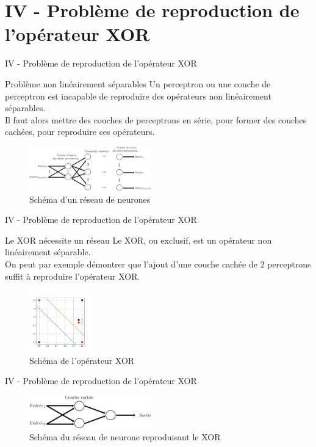 \documentclass[10pt]{beamer}
\begin{document}
\section{IV - Problème de reproduction de l'opérateur XOR}
\begin{frame}{IV - Problème de reproduction de l'opérateur XOR}
\begin{block}{Problème non linéairement séparables}
Un perceptron ou une couche de perceptron est incapable de reproduire des opérateurs non linéairement séparables. \\
Il faut alors mettre des couches de perceptrons en série, pour former des couches cachées, pour reproduire ces opérateurs. \\
\end{block}
\begin{figure}
	\centering
    \includegraphics[width=200px]{1-Reseau.png}
	\caption{Schéma d'un réseau de neurones}
\end{figure}
\end{frame}

\begin{frame}{IV - Problème de reproduction de l'opérateur XOR}
\begin{block}{Le XOR nécessite un réseau}
Le XOR, ou exclusif, est un opérateur non linéairement séparable. \\
On peut par exemple démontrer que l'ajout d'une couche cachée de 2 perceptrons suffit à reproduire l'opérateur XOR. \\
\begin{figure}
	\centering
    \includegraphics[width=100px]{2-XOR.jpg}
	\caption{Schéma de l'opérateur XOR}
\end{figure}
\end{block}
\end{frame}

\begin{frame}{IV - Problème de reproduction de l'opérateur XOR}

\begin{figure}
	\centering
    \includegraphics[width=200px]{3-Model.png}
	\caption{Schéma du réseau de neurone reproduisant le XOR}
\end{figure}

\end{frame}
\end{document}
